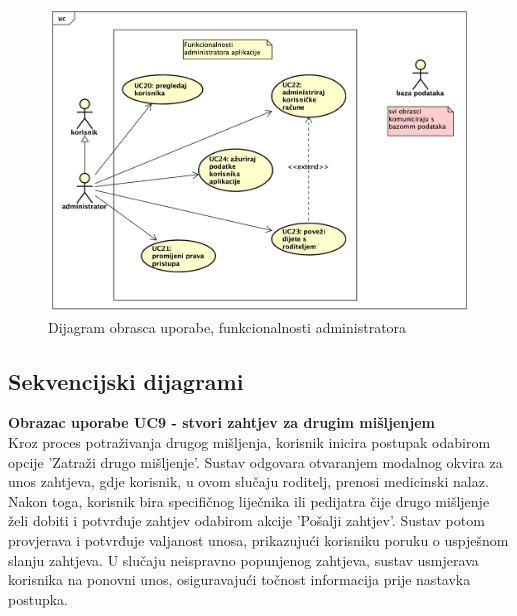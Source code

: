 					\begin{figure}[H]
						\includegraphics[width=\textwidth]{slike/uc_admin.png} 
						\caption{Dijagram obrasca uporabe, funkcionalnosti administratora}
					\end{figure}
				\eject		
				
			\subsection{Sekvencijski dijagrami}
				
				
				\noindent\textbf{Obrazac uporabe UC9 - stvori zahtjev za drugim mišljenjem}\\
				Kroz proces potraživanja drugog mišljenja, korisnik inicira postupak odabirom opcije 
				'Zatraži drugo mišljenje'. Sustav odgovara otvaranjem modalnog okvira za unos zahtjeva, 
				gdje korisnik, u ovom slučaju roditelj, prenosi medicinski nalaz. Nakon toga, korisnik 
				bira specifičnog liječnika ili pedijatra čije drugo mišljenje želi dobiti i potvrđuje 
				zahtjev odabirom akcije 'Pošalji zahtjev'. Sustav potom provjerava i potvrđuje valjanost 
				unosa, prikazujući korisniku poruku o uspješnom slanju zahtjeva. U slučaju neispravno 
				popunjenog zahtjeva, sustav usmjerava korisnika na ponovni unos, osiguravajući točnost 
				informacija prije nastavka postupka. \\

